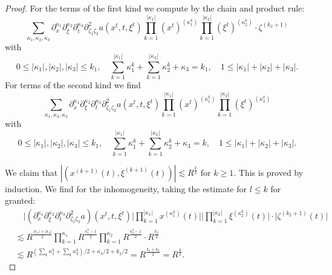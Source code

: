 \documentclass{amsart}
\theoremstyle{definition}
\begin{document}
\begin{proof}
For the terms of the first kind we compute by the chain and product rule:
\begin{equation*}
\sum_{\kappa_1, \kappa_2, \kappa_3} \partial_x^{\kappa_1} \partial_{\xi}^{\kappa_2} \partial_t^{\kappa_3} \partial^2_{\zeta_1 \zeta_2} a(x^t,t,\xi^t) \prod_{k=1}^{|\kappa_1|} (x^t)^{(\kappa_1^k)} \prod_{k=1}^{|\kappa_2|} (\xi^t)^{(\kappa_2^k)} \cdot \zeta^{(k_2+1)}
\end{equation*}
with
\begin{equation*}
0 \leq |\kappa_1|, |\kappa_2|, |\kappa_3| \leq k_1, \quad \sum_{k=1}^{|\kappa_1|} \kappa_1^{k} + \sum_{k=1}^{|\kappa_2|} \kappa_2^k + \kappa_3 = k_1, \quad 1 \leq |\kappa_1| + |\kappa_2| + |\kappa_3|.
\end{equation*}
For terms of the second kind we find
\begin{equation*}
\sum_{\kappa_1, \kappa_2, \kappa_3} \partial_x^{\kappa_1} \partial_{\xi}^{\kappa_2} \partial_t^{\kappa_3} \partial^2_{\zeta_1 \zeta_2} a(x^t,t,\xi^t) \prod_{k=1}^{|\kappa_1|} (x^t)^{(\kappa_1^k)} \prod_{k=1}^{|\kappa_2|} (\xi^t)^{(\kappa_2^k)} 
\end{equation*}
with
\begin{equation*}
0 \leq |\kappa_1|, |\kappa_2|, |\kappa_3| \leq k_1, \quad \sum_{k=1}^{|\kappa_1|} \kappa_1^{k} + \sum_{k=1}^{|\kappa_2|} \kappa_2^k + \kappa_3 = k, \quad 1 \leq |\kappa_1| + |\kappa_2| + |\kappa_3|.
\end{equation*}


We claim that $|(x^{(k+1)}(t),\xi^{(k+1)}(t))| \lesssim R^{\frac{k}{2}}$  for $k \geq 1$. This is proved by induction. We find for the inhomogeneity, taking the estimate for $l \leq k$ for granted:
\begin{equation*}
\begin{split}
&\quad \big| (\partial_x^{\kappa_1} \partial_{\xi}^{\kappa_2} \partial_t^{\kappa_3} \partial^2_{\zeta_1 \zeta_2} a)(x^t,t,\xi^t) \big| \prod_{k=1}^{|\kappa_1|} x^{(\kappa_1^k)}(t) \big| \big| \prod_{k=1}^{|\kappa_2|} \xi^{(\kappa_2^k)}(t) \big| \cdot \big| \zeta^{(k_2+1)}(t) \big| \\
&\lesssim R^{\frac{|\kappa_1|+|\kappa_3|}{2}} \prod_{k=1}^{\kappa_1} R^{\frac{\kappa_1^k-1}{2}} \prod_{k=1}^{\kappa_2} R^{\frac{\kappa_2^k-1}{2}} \cdot R^{\frac{k_2}{2}} \\
&\lesssim R^{(\sum_k \kappa_1^k + \sum_k \kappa_2^k)/2 + \kappa_3 /2 +  k_2 / 2} = R^{\frac{k_1+k_2}{2}} = R^{\frac{k}{2}}.
\end{split}
\end{equation*}


\end{proof}
\end{document}
